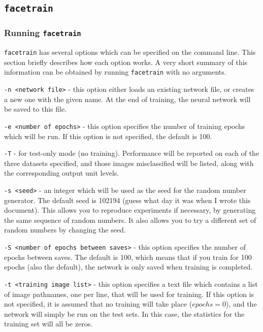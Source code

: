 \subsection {\tt facetrain}

\subsubsection{Running {\tt facetrain}}
\label{RUNFACE}

{\tt facetrain} has several options which can be specified on the
command line.  This section briefly describes how each option
works.  A very short summary of this information can be obtained
by running {\tt facetrain} with no arguments.

\begin{description}
\item {\tt -n <network file>} - this option either loads an existing
network file, or creates a new one with the given name.  At the end
of training, the neural network will be saved to this file.

\item {\tt -e <number of epochs>} - this option specifies the number
of training epochs which will be run.  If this option is not
specified, the default is 100.

\item {\tt -T} - for test-only mode (no training).  Performance
will be reported on each of the three datasets specified, and
those images misclassified will be listed, along with the corresponding
output unit levels.

\item {\tt -s <seed>} - an integer which will be used as the
seed for the random number generator.  The default seed is 102194
(guess what day it was when I wrote this document).  This allows you to
reproduce experiments if necessary, by generating the same sequence of
random numbers.  It also allows you to try a different set of random
numbers by changing the seed.

\item {\tt -S <number of epochs between saves>} - this option specifies
the number of epochs between saves.  The default is 100, which means
that if you train for 100 epochs (also the default), the network is
only saved when training is completed.

\item {\tt -t <training image list>} - this option specifies a text
file which contains a list of image pathnames, one per line, that
will be used for training.  If this option is not specified, it
is assumed that no training will take place ($epochs = 0$), and
the network will simply be run on the test sets.  In this case,
the statistics for the training set will all be zeros.


\end{description}
